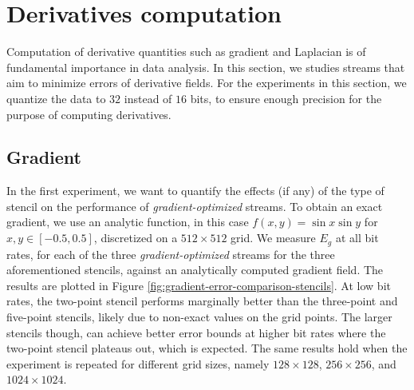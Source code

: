 \section{Derivatives computation}
\label{sec:derivatives}

Computation of derivative quantities such as gradient and Laplacian is of fundamental importance in
data analysis. In this section, we studies streams that aim to minimize errors of derivative fields.
For the experiments in this section, we quantize the data to $32$ instead of $16$ bits, to ensure
enough precision for the purpose of computing derivatives.

\subsection{Gradient}


In the first experiment, we want to quantify the effects (if any) of the type of stencil on the
performance of \emph{gradient-optimized} streams. To obtain an exact gradient, we use an analytic
function, in this case $f(x,y)=\sin x\sin y$ for $x,y\in[-0.5,0.5]$, discretized on a $512\times
512$ grid. We measure $E_g$ at all bit rates, for each of the three \emph{gradient-optimized}
streams for the three aforementioned stencils, against an analytically computed gradient field. The
results are plotted in Figure \ref{fig:gradient-error-comparison-stencils}. At low bit rates, the
two-point stencil performs marginally better than the three-point and five-point stencils, likely
due to non-exact values on the grid points. The larger stencils though, can achieve better error
bounds at higher bit rates where the two-point stencil plateaus out, which is expected. The same
results hold when the experiment is repeated for different grid sizes, namely $128\times 128$,
$256\times 256$, and $1024 \times 1024$.


